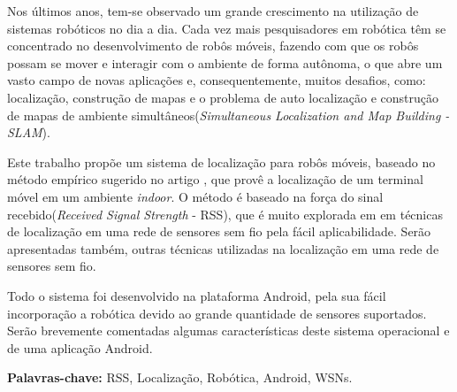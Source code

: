 	Nos últimos anos, tem-se observado um grande crescimento na utilização de sistemas robóticos no dia a dia.
	Cada vez mais pesquisadores em robótica têm se concentrado no desenvolvimento de robôs móveis, fazendo com que os
	 robôs possam se mover e interagir com o ambiente de forma autônoma, 
	o que abre um vasto campo de novas aplicações e, consequentemente, muitos desafios, como:  localização, construção de mapas e o problema
	de auto localização e construção 
  de mapas de ambiente simultâneos(\textit{Simultaneous Localization and Map Building - SLAM}). 
		
    Este trabalho propõe um sistema de localização para robôs móveis, 
    baseado no método empírico sugerido no artigo \cite{wifiRadar},
    que provê a localização de um terminal móvel em um ambiente \textit{indoor}. 
    O método é baseado na força do 
    sinal recebido(\textit{Received Signal Strength} - RSS), que é muito explorada em
    em técnicas de localização em uma rede de sensores sem fio pela fácil aplicabilidade. Serão apresentadas também, outras 
    técnicas utilizadas na localização em uma rede de sensores sem fio.
  
	Todo o sistema foi desenvolvido na plataforma Android, pela sua fácil incorporação a robótica devido ao 
	grande quantidade de sensores suportados. Serão brevemente comentadas
	algumas características deste sistema operacional e de uma aplicação Android.
   
\textbf{Palavras-chave:} RSS, Localização, Robótica, Android, WSNs.
